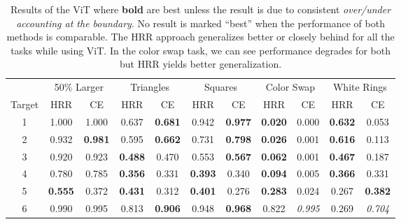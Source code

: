 \documentclass[letterpaper]{article} %
\begin{document}
\begin{table}[!t]
\centering
\begin{tabular}{@{}ccccccccccc@{}}
\toprule
& \multicolumn{2}{c}{50\% Larger} & \multicolumn{2}{c}{Triangles}   & \multicolumn{2}{c}{Squares}     & \multicolumn{2}{c}{Color Swap} & \multicolumn{2}{c}{White Rings} \\ \cmidrule(r){2-3} \cmidrule(r){4-5} \cmidrule(lr){6-7} \cmidrule(r){8-9} \cmidrule(l){10-11}
Target & HRR & CE & HRR & CE & HRR & CE & HRR & CE & HRR & CE  \\ \midrule
1 & 1.000 & 1.000 & 0.637 & \textbf{0.681} & 0.942 & \textbf{0.977} & \textbf{0.020} & 0.000 & \textbf{0.632} & 0.053 \\
2 & 0.932 & \textbf{0.981} & 0.595 & \textbf{0.662} & 0.731 & \textbf{0.798} & \textbf{0.026} & 0.001 & \textbf{0.616} & 0.113 \\
3 & 0.920 & 0.923 & \textbf{0.488} & 0.470 & 0.553 & \textbf{0.567} & \textbf{0.062} & 0.001 & \textbf{0.467} & 0.187 \\
4 & 0.780 & 0.785 & \textbf{0.356} & 0.331 & \textbf{0.393} & 0.340 & \textbf{0.094} & 0.005 & \textbf{0.366} & 0.331 \\
5 & \textbf{0.555} & 0.372 & \textbf{0.431} & 0.312 & \textbf{0.401} & 0.276 & \textbf{0.283} & 0.024 & 0.267 & \textbf{0.382} \\
6 & 0.990 & 0.995 & 0.813 & \textbf{0.906} & 0.948 & \textbf{0.968} & 0.822 & \textit{0.995} & 0.269 & \textit{0.704} \\ \bottomrule
\end{tabular}
\caption{Results of the ViT where \textbf{bold} are best unless the result is due to consistent \textit{over/under accounting at the boundary}. No result is marked ``best'' when the performance of both methods is comparable. The HRR approach generalizes better or closely behind for all the tasks while using ViT. In the color swap task, we can see performance degrades for both but HRR yields better generalization.}
\label{tbl:vit}
\end{table}
\end{document}
